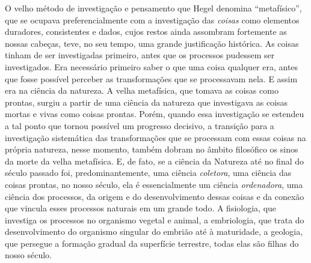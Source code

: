 O velho método de investigação e pensamento
que Hegel 
denomina ``metafísico'', que se ocupava preferencialmente com a
investigação das \emph{coisas }como elementos duradores, 
consistentes e dados, cujos restos ainda assombram
fortemente as nossas cabeças, teve, no seu tempo, uma grande
justificação histórica. As coisas tinham de ser investigadas primeiro,
antes que os processos pudessem ser investigados. Era necessário
primeiro saber o que uma coisa qualquer era, antes que fosse possível
perceber as transformações que se processavam nela. E assim era na
ciência da natureza. A velha metafísica, que tomava as coisas como
prontas, surgiu a partir de uma ciência da natureza que investigava as
coisas mortas e vivas como coisas prontas. Porém, quando essa
investigação se estendeu a tal ponto que tornou possível um progresso
decisivo, a transição para a investigação sistemática das transformações
que se processam com essas coisas na própria natureza, nesse momento,
também dobram no âmbito filosófico os sinos da morte da velha
metafísica. E, de fato, se a ciência da Natureza até no final do século
passado foi, predominantemente, uma ciência \emph{coletora}, uma ciência
das coisas prontas, no nosso século, ela é essencialmente um
ciência \emph{ordenadora}, uma ciência dos processos, da origem e do
desenvolvimento dessas coisas e da conexão que vincula esses processos
naturais em um grande todo. A fisiologia, que investiga os processos no
organismo vegetal e animal, a embriologia, que trata do desenvolvimento
do organismo singular do embrião até à maturidade, a geologia, que
persegue a formação gradual da superfície terrestre, todas elas são
filhas do nosso século.

